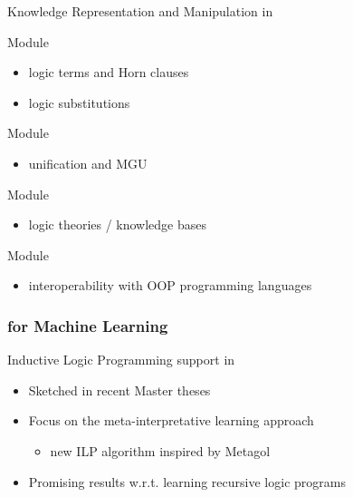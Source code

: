 \documentclass[presentation]{beamer}\mode<presentation>{\usetheme{AMSBolognaFC}}
\begin{document}
\begin{frame}{Knowledge Representation and Manipulation in \twopkt}
    \begin{block}{Module }
        \begin{multicols}{2}
            \begin{itemize}
                \item logic terms and Horn clauses
                \item logic substitutions
            \end{itemize}
        \end{multicols}
    \end{block}

    \begin{block}{Module }
        \begin{itemize}
            \item unification and MGU
        \end{itemize}
    \end{block}

    \begin{block}{Module }
        \begin{itemize}
            \item logic theories / knowledge bases
        \end{itemize}
    \end{block}

    \begin{block}{Module }
        \begin{itemize}
            \item interoperability with OOP programming languages
        \end{itemize}
    \end{block}
\end{frame}

\subsubsection{\twopkt{} for Machine Learning}

\begin{frame}{Inductive Logic Programming support in \twopkt{}}
    \begin{itemize}
        \item Sketched in recent \alert{Master theses}
        
        \vfill

        \item Focus on the \alert{meta-interpretative learning} approach
        \begin{itemize}
            \item new ILP algorithm inspired by Metagol
        \end{itemize}

        \vfill

        \item Promising results w.r.t. learning \alert{recursive} logic programs
    \end{itemize}
\end{frame}
\end{document}
